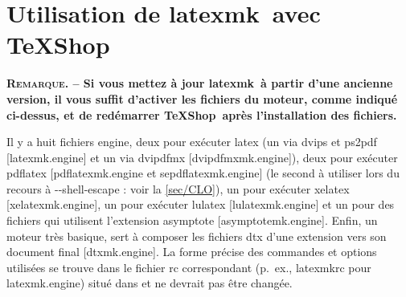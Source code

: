 \documentclass[11pt,french]{article}
\newcommand{\TS}{\textsf{\TeX Shop}}
\newcommand{\latexmk}{\textsf{latexmk}}
\newcommand{\cmd}[1]{\textsf{#1}}
\begin{document}
%
%


\section{Utilisation de \latexmk\ avec \TS}%

\noindent\textbf{\textsc{Remarque}. -- Si vous mettez à jour \latexmk\ à partir d'une ancienne version, il vous suffit d'activer les fichiers du moteur, comme indiqué ci-dessus, et de redémarrer \TS\ après l'installation des fichiers.}

Il y a huit fichiers \cmd{engine}, deux pour exécuter \cmd{latex} (un via \cmd{dvips} et \cmd{ps2pdf} [\cmd{latexmk.engine}] et un via \cmd{dvipdfmx} [\cmd{dvipdfmxmk.engine}]), deux pour exécuter \cmd{pdflatex} [\cmd{pdflatexmk.engine} et \cmd{sepdflatexmk.engine}] (le second à utiliser lors du recours à \cmd{-{}-shell-escape} : voir la \cref{sec/CLO}), un pour exécuter \cmd{xelatex} [\cmd{xelatexmk.engine}], un pour exécuter \cmd{lulatex} [\cmd{lulatexmk.engine}] et un pour des fichiers qui utilisent l'extension \cmd{asymptote} [\cmd{asymptotemk.engine}]. Enfin, un moteur très basique, sert à composer les fichiers \cmd{dtx} d'une extension vers son document final [\cmd{dtxmk.engine}]. La forme précise des commandes et options utilisées se trouve dans le fichier \cmd{rc} correspondant (p.~ex., \cmd{latexmkrc} pour \cmd{latexmk.engine}) situé dans  et ne devrait pas être changée.
\end{document}
